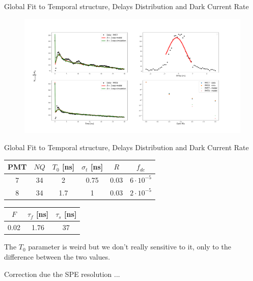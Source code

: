 \documentclass{beamer}
\begin{document}
\begin{frame}{Global Fit to Temporal structure, Delays Distribution and Dark Current Rate}
\begin{center}
\begin{figure}[h]
\includegraphics[width=1\textwidth]{fit4.png}
\end{figure}
\end{center}

\end{frame}

\begin{frame}{Global Fit to Temporal structure, Delays Distribution and Dark Current Rate}
\begin{center}
\begin{tabular}{|c||c|c|c|c|c|} 
\hline
PMT & $NQ$ & $T_0$ [ns]& $\sigma_t$ [ns] & $R$ & $f_{dc}$\\ 
\hline\hline
7 & 34 & 2 & 0.75 & 0.03  & $6\cdot10^{-5}$ \\
\hline
8 & 34 & 1.7 & 1 & 0.03 &  $2\cdot10^{-5}$ \\
\hline
\end{tabular}
\end{center}

\begin{center}
\begin{tabular}{|c|c|c|} 
\hline
$F$ & $\tau_f$ [ns]& $\tau_s$ [ns] \\ 
\hline\hline
0.02 & 1.76 & 37 \\
\hline
\end{tabular}
\end{center}

The $T_0$ parameter is weird but we don't really sensitive to it, only to the difference between the two values.
\end{frame}


\begin{frame}{Correction due the SPE resolution}
...
\end{frame}
\end{document}
